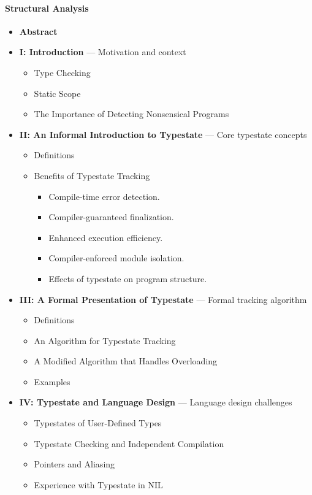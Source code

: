 \documentclass{article}
\begin{document}
\paragraph{Structural Analysis}
\begin{itemize}
    \item \textbf{Abstract}

    \item \textbf{I: Introduction} --- Motivation and context
    \begin{itemize}
        \item Type Checking
        \item Static Scope
        \item The Importance of Detecting Nonsensical Programs
    \end{itemize}

    \item \textbf{II: An Informal Introduction to Typestate} --- Core typestate concepts
    \begin{itemize}
        \item Definitions
        \item Benefits of Typestate Tracking
        \begin{itemize}
            \item Compile-time error detection.
            \item Compiler-guaranteed finalization.
            \item Enhanced execution efficiency.
            \item Compiler-enforced module isolation.
            \item Effects of typestate on program structure.
        \end{itemize}
    \end{itemize}

    \item \textbf{III: A Formal Presentation of Typestate} --- Formal tracking algorithm
    \begin{itemize}
        \item Definitions
        \item An Algorithm for Typestate Tracking
        \item A Modified Algorithm that Handles Overloading
        \item Examples
    \end{itemize}

    \item \textbf{IV: Typestate and Language Design} --- Language design challenges
    \begin{itemize}
        \item Typestates of User-Defined Types
        \item Typestate Checking and Independent Compilation
        \item Pointers and Aliasing
        \item Experience with Typestate in NIL
    \end{itemize}


\end{itemize}
\end{document}
